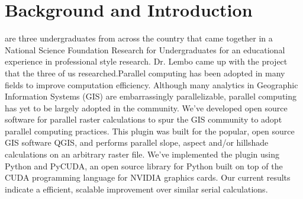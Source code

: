 \documentclass[journal]{IEEEtran}
\begin{document}
\section{Background and Introduction}
% 
% 
% 
% 
 are three undergraduates from across the country that came
together in a National Science Foundation Research for Undergraduates for an 
educational experience in professional style research. Dr. Lembo came up with
the project that the three of us researched.Parallel computing has been adopted
in many fields to improve computation efficiency. Although many analytics in 
Geographic Information Systems (GIS) are embarrassingly parallelizable, 
parallel computing has yet to be largely adopted in the community. We've 
developed open source software for parallel raster calculations to spur the GIS
community to adopt parallel computing practices. This plugin was built for the
popular, open source GIS software QGIS, and performs parallel slope, aspect 
and/or hillshade calculations on an arbitrary raster file.  We've implemented 
the plugin using Python and PyCUDA, an open source library for Python built on 
top of the CUDA programming language for \textsc{NVIDIA} graphics cards. Our
current results indicate a efficient, scalable improvement over similar serial
calculations.
\end{document}
